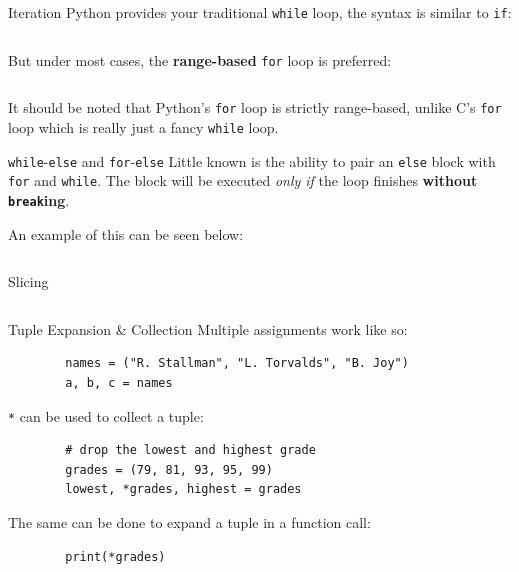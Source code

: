 \documentclass{lug}
\begin{document}
\begin{frame}{Iteration}
    Python provides your traditional \texttt{while} loop, the syntax is similar
    to \texttt{if}:

    \inputminted{python3}{examples/while.py}

    \pause

    But under most cases, the \textbf{range-based} \texttt{for} loop is preferred:

    \inputminted{python3}{examples/for.py}

    {\small%
    It should be noted that Python's \texttt{for} loop is strictly range-based,
    unlike C's \texttt{for} loop which is really just a fancy \texttt{while}
    loop.
    }
\end{frame}

\begin{frame}{\texttt{while}-\texttt{else} and \texttt{for}-\texttt{else}}
    Little known is the ability to pair an \texttt{else} block with
    \texttt{for} and \texttt{while}. The block will be executed \emph{only if}
    the loop finishes \textbf{without \texttt{break}ing}.

    An example of this can be seen below:
    \inputminted{python3}{examples/forelse.py}
\end{frame}

\begin{frame}{Slicing}
    \inputminted{python3}{examples/slicing.py}
\end{frame}

\begin{frame}[fragile]{Tuple Expansion \& Collection}
    Multiple assignments work like so:
    \begin{verbatim}
        names = ("R. Stallman", "L. Torvalds", "B. Joy")
        a, b, c = names
    \end{verbatim}

    \pause

    \texttt{*} can be used to collect a tuple:
    \begin{verbatim}
        # drop the lowest and highest grade
        grades = (79, 81, 93, 95, 99)
        lowest, *grades, highest = grades
    \end{verbatim}

    \pause
    The same can be done to expand a tuple in a function call:
    \begin{verbatim}
        print(*grades)
    \end{verbatim}

\end{frame}
\end{document}
